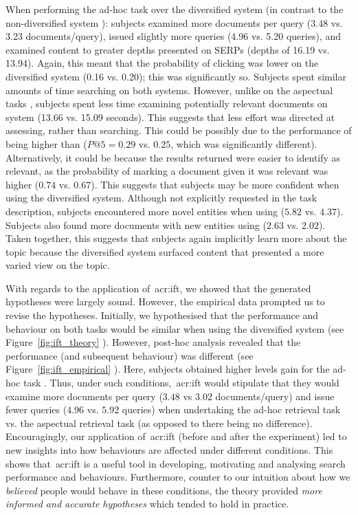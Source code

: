When performing the ad-hoc task  over the diversified system  (in contrast to the non-diversified system ): subjects examined more documents per query (3.48 vs. 3.23 documents/query), issued slightly more queries (4.96 vs. 5.20 queries), and examined content to greater depths presented on SERPs (depths of 16.19 vs. 13.94). Again, this meant that the probability of clicking was lower on the diversified system  (0.16 vs. 0.20); this was significantly so. Subjects spent similar amounts of time searching on both systems. However, unlike on the aspectual tasks , subjects spent less time examining potentially relevant documents on system  (13.66 vs. 15.09 seconds). This suggests that less effort was directed at assessing, rather than searching. This could be possibly due to the performance of  being higher than  ($P@5=0.29$ vs. $0.25$, which was significantly different). Alternatively, it could be because the results returned were easier to identify as relevant, as the probability of marking a document given it was relevant was higher ($0.74$ vs. $0.67$). This suggests that subjects may be more confident when using the diversified system. Although not explicitly requested in the task description, subjects encountered more novel entities when using  ($5.82$ vs. $4.37$). Subjects also found more documents with new entities using  ($2.63$ vs. $2.02$). Taken together, this suggests that subjects again implicitly learn more about the topic because the diversified system  surfaced content that presented a more varied view on the topic.

With regards to the application of~\gls{acr:ift}, we showed that the generated hypotheses were largely sound. However, the empirical data prompted us to revise the hypotheses. Initially, we hypothesised that the performance and behaviour on both tasks would be similar when using the diversified system  (see Figure~\ref{fig:ift_theory} ). However, post-hoc analysis revealed that the performance (and subsequent behaviour) was different (see Figure~\ref{fig:ift_empirical} ). Here, subjects obtained higher levels gain for the ad-hoc task . Thus, under such conditions,~\gls{acr:ift} would stipulate that they would examine more documents per query ($3.48$ vs $3.02$ documents/query) and issue fewer queries ($4.96$ vs. $5.92$ queries) when undertaking the ad-hoc retrieval task  vs. the aspectual retrieval task  (as opposed to there being no difference). Encouragingly, our application of~\gls{acr:ift} (before and after the experiment) led to new insights into how behaviours are affected under different conditions. This shows that~\gls{acr:ift} is a useful tool in developing, motivating and analysing search performance and behaviours. Furthermore, counter to our intuition about how we \emph{believed} people would behave in these conditions, the theory provided \emph{more informed and accurate hypotheses} which tended to hold in practice.

